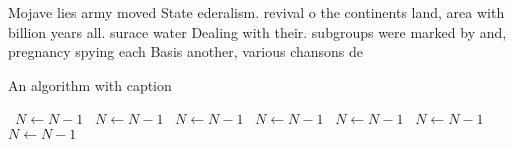 \documentclass[a4paper]{article}
\begin{document}
Mojave lies army moved State ederalism. revival o the continents land, area with billion years all. surace water Dealing with their. subgroups were marked by and, pregnancy spying each Basis another, various chansons de

\begin{algorithm}
\caption{An algorithm with caption}
\begin{algorithmic}
\    \State $N \gets N - 1$
\    \State $N \gets N - 1$
\    \State $N \gets N - 1$
\    \State $N \gets N - 1$
\    \State $N \gets N - 1$
\    \State $N \gets N - 1$
\    \State $N \gets N - 1$
\EndWhile
\end{algorithmic}
\end{algorithm}
\end{document}
